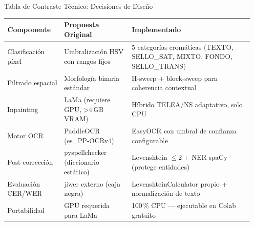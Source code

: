 \documentclass[aspectratio=169, 11pt]{beamer}
\newcommand{\verde}[1]{\textcolor{AccGreen}{#1}}
\newcommand{\mejora}[1]{\verde{\textbf{#1}}}
\newcommand{\original}[1]{\textcolor{OldRed}{\textbf{#1}}}
\begin{document}
\begin{frame}{Tabla de Contraste Técnico: Decisiones de Diseño}
  \centering
  \footnotesize
  \begin{tabular}{@{}p{2.6cm}p{4.2cm}p{4.2cm}@{}}
    \toprule
    \textbf{Componente}
      & \original{Propuesta Original}
      & \mejora{Implementado} \\
    \midrule
    \rowcolor{RowA}
    Clasificación píxel
      & Umbralización HSV con rangos fijos
      & 5 categorías cromáticas (TEXTO, SELLO\_SAT, MIXTO, FONDO, SELLO\_TRANS) \\[4pt]
    \rowcolor{RowB}
    Filtrado espacial
      & Morfología binaria estándar
      & H-sweep + block-sweep para coherencia contextual \\[4pt]
    \rowcolor{RowA}
    Inpainting
      & LaMa (requiere GPU, >4\,GB VRAM)
      & Híbrido TELEA/NS adaptativo, solo CPU \\[4pt]
    \rowcolor{RowB}
    Motor OCR
      & PaddleOCR (es\_PP-OCRv4)
      & EasyOCR con umbral de confianza configurable \\[4pt]
    \rowcolor{RowA}
    Post-corrección
      & pyspellchecker (diccionario estático)
      & Levenshtein $\leq 2$ + NER spaCy (protege entidades) \\[4pt]
    \rowcolor{RowB}
    Evaluación CER/WER
      & jiwer externo (caja negra)
      & LevenshteinCalculator propio + normalización de texto \\[4pt]
    \rowcolor{RowA}
    Portabilidad
      & GPU requerida para LaMa
      & 100\,\% CPU — ejecutable en Colab gratuito \\
    \bottomrule
  \end{tabular}
\end{frame}
\end{document}
